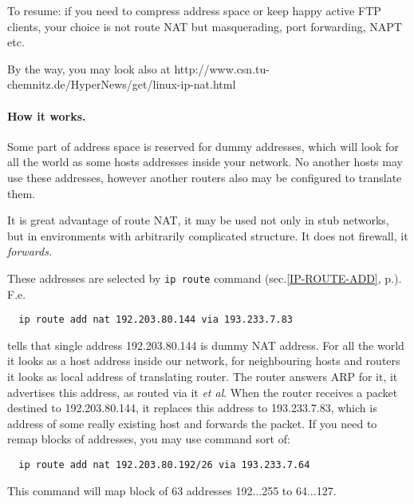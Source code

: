 To resume: if you need to compress address space or keep
happy active FTP clients, your choice is not route NAT but masquerading,
port forwarding, NAPT etc. 
\begin{NB}
By the way, you may look also at
http://www.csn.tu-chemnitz.de/HyperNews/get/linux-ip-nat.html
\end{NB}


\paragraph{How it works.}
Some part of address space is reserved for dummy addresses,
which will look for all the world as some hosts addresses
inside your network. No another hosts may use these addresses,
however another routers also may be configured to translate them.
\begin{NB}
It is great advantage of route NAT, it may be used not
only in stub networks, but in environments with arbitrarily complicated
structure. It does not firewall, it {\em forwards.}
\end{NB}
These addresses are selected by \verb|ip route| command
(sec.\ref{IP-ROUTE-ADD}, p.\pageref{IP-ROUTE-ADD}). F.e.\
\begin{verbatim}
  ip route add nat 192.203.80.144 via 193.233.7.83
\end{verbatim}
tells that single address 192.203.80.144 is dummy NAT address.
For all the world it looks as a host address inside our network,
for neighbouring hosts and routers it looks as local address
of translating router. The router answers ARP for it, it advertises
this address, as routed via it {\em et al\/}. When the router
receives a packet destined to 192.203.80.144, it replaces 
this address to 193.233.7.83, which is address of some really
existing host and forwards the packet. If you need to remap
blocks of addresses, you may use command sort of:
\begin{verbatim}
  ip route add nat 192.203.80.192/26 via 193.233.7.64
\end{verbatim}
This command will map block of 63 addresses 192...255 to 64...127.

